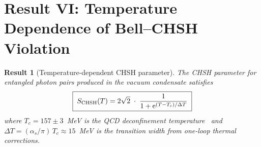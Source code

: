 \documentclass[12pt,a4paper]{article}
\theoremstyle{plain}
\newtheorem{result}{Result}
\theoremstyle{definition}
\theoremstyle{remark}
\newcommand{\ee}{\mathrm{e}}
\begin{document}
\section{Result VI: Temperature Dependence of Bell--CHSH Violation}\label{sec:VI}

\begin{result}[Temperature-dependent CHSH parameter]
\label{thm:bell}
The CHSH parameter for entangled photon pairs produced in
the vacuum condensate satisfies
\begin{equation}\label{eq:bell}
  \boxed{\;
  S_{\rm CHSH}(T) = 2\sqrt{2}\;\cdot\;
  \frac{1}{1 + \ee^{(T - T_c)/\Delta T}}
  \;}
\end{equation}
where $T_c = 157 \pm 3$~MeV is the QCD deconfinement
temperature~\cite{HotQCD2019} and
$\Delta T = (\alpha_s/\pi)\,T_c \approx 15$~MeV is the
transition width from one-loop thermal corrections.
\end{result}
\end{document}
